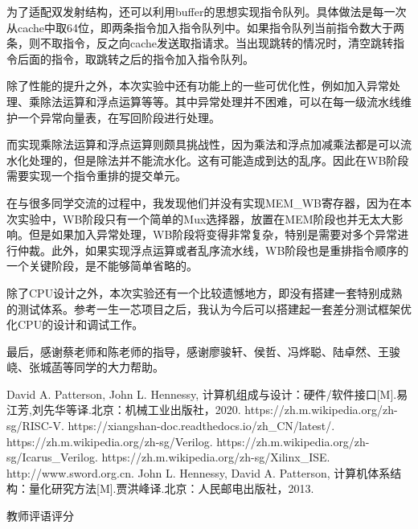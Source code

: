 \documentclass{article}
\begin{document}
        \par{}
        为了适配双发射结构，还可以利用buffer的思想实现指令队列。具体做法是每一次从cache中取64位，即两条指令加入指令队列中。如果指令队列当前指令数大于两条，则不取指令，反之向cache发送取指请求。当出现跳转的情况时，清空跳转指令后面的指令，取跳转之后的指令加入指令队列。
        \par{}
        除了性能的提升之外，本次实验中还有功能上的一些可优化性，例如加入异常处理、乘除法运算和浮点运算等等。其中异常处理并不困难，可以在每一级流水线维护一个异常向量表，在写回阶段进行处理。
        \par{}
        而实现乘除法运算和浮点运算则颇具挑战性，因为乘法和浮点加减乘法都是可以流水化处理的，但是除法并不能流水化。这有可能造成到达的乱序。因此在WB阶段需要实现一个指令重排的提交单元。{\cite{ref8}}
        \par{}
        在与很多同学交流的过程中，我发现他们并没有实现MEM\_WB寄存器，因为在本次实验中，WB阶段只有一个简单的Mux选择器，放置在MEM阶段也并无太大影响。但是如果加入异常处理，WB阶段将变得非常复杂，特别是需要对多个异常进行仲裁。此外，如果实现浮点运算或者乱序流水线，WB阶段也是重排指令顺序的一个关键阶段，是不能够简单省略的。
        \par{}
        除了CPU设计之外，本次实验还有一个比较遗憾地方，即没有搭建一套特别成熟的测试体系。参考一生一芯项目之后，我认为今后可以搭建起一套差分测试框架优化CPU的设计和调试工作。
        \par{}
        最后，感谢蔡老师和陈老师的指导，感谢廖骏轩、侯哲、冯烨聪、陆卓然、王骏峣、张城菡等同学的大力帮助。

    \newpage{}
    \begin{thebibliography}{99}
        David A. Patterson, John L. Hennessy, 计算机组成与设计：硬件/软件接口[M].易江芳,刘先华等译.北京：机械工业出版社，2020.
        https://zh.m.wikipedia.org/zh-sg/RISC-V.
        https://xiangshan-doc.readthedocs.io/zh\_CN/latest/.
        https://zh.m.wikipedia.org/zh-sg/Verilog.
        https://zh.m.wikipedia.org/zh-sg/Icarus\_Verilog.
        https://zh.m.wikipedia.org/zh-sg/Xilinx\_ISE.
        http://www.sword.org.cn.
        John L. Hennessy, David A. Patterson, 计算机体系结构：量化研究方法[M].贾洪峰译.北京：人民邮电出版社，2013.
    \end{thebibliography}

    \newpage{}
    \begin{center}
        {
            教师评语评分
        }
    \end{center}
\end{document}
